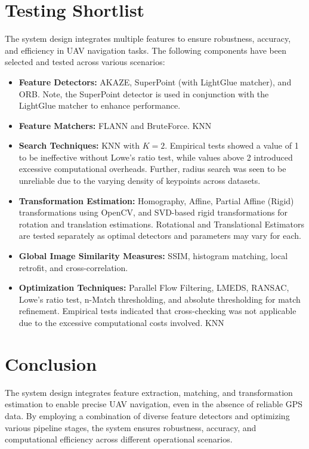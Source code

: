 \section{Testing Shortlist}

The system design integrates multiple features to ensure robustness, accuracy, and efficiency in UAV navigation tasks. The following components have been selected and tested across various scenarios:

\begin{itemize}
    \item \textbf{Feature Detectors:} AKAZE, SuperPoint (with LightGlue matcher), and ORB. Note, the SuperPoint detector is used in conjunction with the LightGlue matcher to enhance performance.
    \item \textbf{Feature Matchers:} FLANN and BruteForce. KNN 
    \item \textbf{Search Techniques:} KNN with \( K=2 \). Empirical tests showed a value of 1 to be ineffective without Lowe's ratio test, while values above 2 introduced excessive computational overheads. Further, radius search was seen to be unreliable due to the varying density of keypoints across datasets.
    \item \textbf{Transformation Estimation:} Homography, Affine, Partial Affine (Rigid) transformations using OpenCV, and SVD-based rigid transformations for rotation and translation estimations. Rotational and Translational Estimators are tested separately as optimal detectors and parameters may vary for each.
    \item \textbf{Global Image Similarity Measures:} SSIM, histogram matching, local retrofit, and cross-correlation.
    \item \textbf{Optimization Techniques:} Parallel Flow Filtering, LMEDS, RANSAC, Lowe's ratio test, n-Match thresholding, and absolute thresholding for match refinement. Empirical tests indicated that cross-checking was not applicable due to the excessive computational costs involved. KNN
\end{itemize}


\section{Conclusion}

The system design integrates feature extraction, matching, and transformation estimation to enable precise UAV navigation, even in the absence of reliable GPS data. By employing a combination of diverse feature detectors and optimizing various pipeline stages, the system ensures robustness, accuracy, and computational efficiency across different operational scenarios. 

